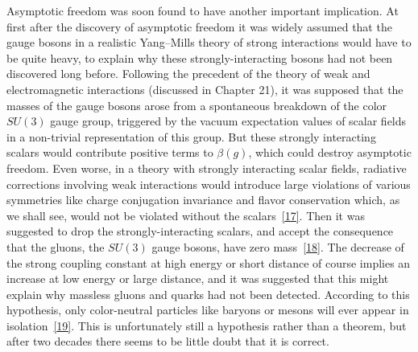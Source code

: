 Asymptotic freedom was soon found to have another important implication. At first after the discovery of asymptotic freedom it was widely assumed that the gauge bosons in a realistic Yang--Mills theory of strong interactions would have to be quite heavy, to explain why these strongly-interacting bosons had not been discovered long before. Following the precedent of the theory of weak and electromagnetic interactions (discussed in Chapter 21), it was supposed that the masses of the gauge bosons arose from a spontaneous breakdown of the color $SU(3)$ gauge group, triggered by the vacuum expectation values of scalar fields in a non-trivial representation of this group. But these strongly interacting scalars would contribute positive terms to $\beta(g)$, which could destroy asymptotic freedom. Even worse, in a theory with strongly interacting scalar fields, radiative corrections involving weak interactions would introduce large violations of various symmetries like charge conjugation invariance and flavor conservation which, as we shall see, would not be violated without the scalars~\hyperref[ch18-ref-17]{[17]}. Then it was suggested to drop the strongly-interacting scalars, and accept the consequence that the gluons, the $SU(3)$ gauge bosons, have zero mass~\hyperref[ch18-ref-18]{[18]}. The decrease of the strong coupling constant at high energy or short distance of course implies an increase at low energy or large distance, and it was suggested that this might explain why massless gluons and quarks had not been detected. According to this hypothesis, only color-neutral particles like baryons or mesons will ever appear in isolation~\hyperref[ch18-ref-19]{[19]}. This is unfortunately still a hypothesis rather than a theorem, but after two decades there seems to be little doubt that it is correct.

